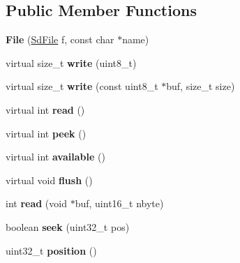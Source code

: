 \subsection*{Public Member Functions}
\begin{DoxyCompactItemize}
\item 
\hypertarget{class_file_a5dddb920773bfa0a77cc042d7521defb}{{\bfseries File} (\hyperlink{class_sd_file}{Sd\-File} f, const char $\ast$name)}\label{class_file_a5dddb920773bfa0a77cc042d7521defb}

\item 
\hypertarget{class_file_a4921dd89e0f14a9b77dfb3d7960401ca}{virtual size\-\_\-t {\bfseries write} (uint8\-\_\-t)}\label{class_file_a4921dd89e0f14a9b77dfb3d7960401ca}

\item 
\hypertarget{class_file_adf16c3bdf28db7016c114755d3b6389f}{virtual size\-\_\-t {\bfseries write} (const uint8\-\_\-t $\ast$buf, size\-\_\-t size)}\label{class_file_adf16c3bdf28db7016c114755d3b6389f}

\item 
\hypertarget{class_file_aaab5dab5b969a87f538242e524431637}{virtual int {\bfseries read} ()}\label{class_file_aaab5dab5b969a87f538242e524431637}

\item 
\hypertarget{class_file_a9040fa1d479d71edf3a826f4691c35c4}{virtual int {\bfseries peek} ()}\label{class_file_a9040fa1d479d71edf3a826f4691c35c4}

\item 
\hypertarget{class_file_a4549a76725f2e4c013e4d57018366109}{virtual int {\bfseries available} ()}\label{class_file_a4549a76725f2e4c013e4d57018366109}

\item 
\hypertarget{class_file_adac116554b543b7c4228c018a85882f5}{virtual void {\bfseries flush} ()}\label{class_file_adac116554b543b7c4228c018a85882f5}

\item 
\hypertarget{class_file_a4aee3575457fb781c10945113a0af5c6}{int {\bfseries read} (void $\ast$buf, uint16\-\_\-t nbyte)}\label{class_file_a4aee3575457fb781c10945113a0af5c6}

\item 
\hypertarget{class_file_a262bb0ab26749aa8629461764e312153}{boolean {\bfseries seek} (uint32\-\_\-t pos)}\label{class_file_a262bb0ab26749aa8629461764e312153}

\item 
\hypertarget{class_file_af9d7b8cbf2b44dc3f436ffabeeacc8fd}{uint32\-\_\-t {\bfseries position} ()}\label{class_file_af9d7b8cbf2b44dc3f436ffabeeacc8fd}


\end{DoxyCompactItemize}
